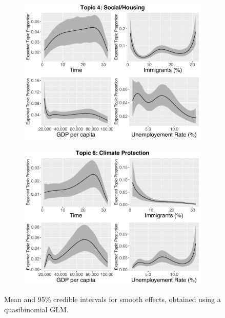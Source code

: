 \begin{figure}[h!]
  \centering
  \captionsetup{justification=centering,margin=2cm}
  \begin{subfigure}[b]{0.49\linewidth}
    \includegraphics[width=\linewidth]{../plots/4_4/quasi_t4_cont.pdf}
  \end{subfigure}
  \begin{subfigure}[b]{0.49\linewidth}
    \includegraphics[width=\linewidth]{../plots/4_4/quasi_t6_cont.pdf}
  \end{subfigure}
  \caption{Mean and 95\% credible intervals for smooth effects, obtained using a quasibinomial GLM.}
  \label{fig:coffee}
\end{figure}

